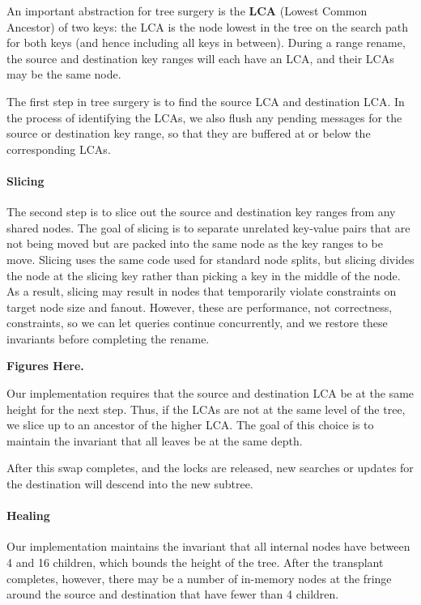 An important abstraction for tree surgery is the \textbf{LCA}
(Lowest Common Ancestor) of two keys: the LCA is the \bet node lowest in the
tree on the search path for both keys (and hence including all keys in between).
During a range rename, the source and destination key ranges will each have an
LCA, and their LCAs may be the same node.

The first step in tree surgery is to find the source LCA and destination LCA.
In the process of identifying the LCAs, we also flush any pending messages for
the source or destination key range, so that they are buffered at or below the
corresponding LCAs.

\paragraph{Slicing}  The second step is to slice out the source and destination
key ranges from any shared nodes.
The goal of slicing is to separate unrelated key-value pairs that are not being
moved but are packed into the same \bet node as the key ranges to be move.
Slicing uses the same  code used for standard \bet node splits, but slicing
divides the node at the slicing key rather than picking a key in the middle of
the node.
As a result, slicing may result in nodes that temporarily violate constraints on
target node size and fanout.
However, these are performance, not correctness, constraints, so we can let
queries continue concurrently, and we restore these invariants before completing
the rename.

\textbf{Figures Here.}

Our implementation requires that the source and destination LCA be at the same
height for the next step.
Thus, if the LCAs are not at the same level of the tree, we slice up to an
ancestor of the higher LCA.
The goal of this choice is to maintain the invariant that all \bet leaves be
at the same depth.

After this swap completes, and the locks are released,
new searches or updates for the destination will descend into the new subtree.

\paragraph{Healing}  Our \bet implementation maintains the
invariant that all internal nodes have between 4 and 16 children,
which bounds the height of the tree.  After the transplant completes,
however, there may be a number of in-memory \bet nodes at the fringe
around the source and destination that have fewer than 4 children.

